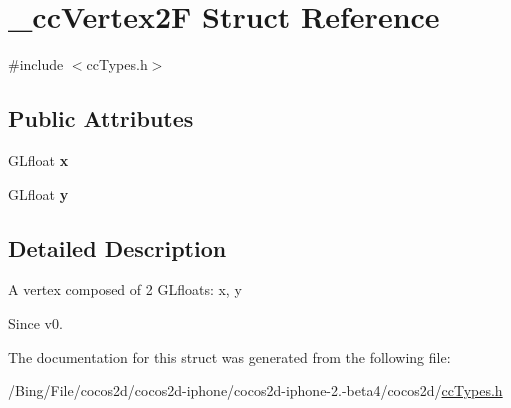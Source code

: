 \hypertarget{struct__cc_vertex2_f}{\section{\-\_\-cc\-Vertex2\-F Struct Reference}
\label{struct__cc_vertex2_f}
}


{\ttfamily \#include $<$cc\-Types.\-h$>$}

\subsection*{Public Attributes}
\begin{DoxyCompactItemize}
\item 
\hypertarget{struct__cc_vertex2_f_ab23767055ea1850786a4e01a0955a45a}{G\-Lfloat {\bfseries x}}\label{struct__cc_vertex2_f_ab23767055ea1850786a4e01a0955a45a}

\item 
\hypertarget{struct__cc_vertex2_f_a4df0354a4460724a818419ce251d863a}{G\-Lfloat {\bfseries y}}\label{struct__cc_vertex2_f_a4df0354a4460724a818419ce251d863a}

\end{DoxyCompactItemize}


\subsection{Detailed Description}
A vertex composed of 2 G\-Lfloats\-: x, y \begin{DoxySince}{Since}
v0. 
\end{DoxySince}


The documentation for this struct was generated from the following file\-:\begin{DoxyCompactItemize}
\item 
/\-Bing/\-File/cocos2d/cocos2d-\/iphone/cocos2d-\/iphone-\/2.-\/beta4/cocos2d/\hyperlink{cc_types_8h}{cc\-Types.\-h}\end{DoxyCompactItemize}
